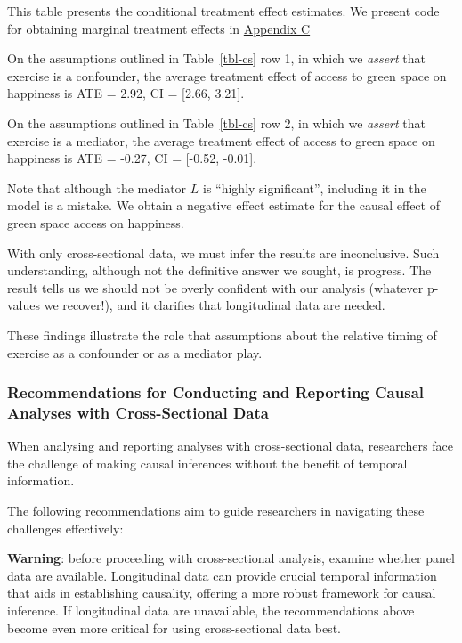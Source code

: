 \documentclass[
  singlecolumn]{article}
\begin{document}
This table presents the conditional treatment effect estimates. We
present code for obtaining marginal treatment effects in
\hyperref[appendix-c]{Appendix C}

On the assumptions outlined in Table~\ref{tbl-cs} row 1, in which we
\emph{assert} that exercise is a confounder, the average treatment
effect of access to green space on happiness is ATE = 2.92, CI =
{[}2.66, 3.21{]}.

On the assumptions outlined in Table~\ref{tbl-cs} row 2, in which we
\emph{assert} that exercise is a mediator, the average treatment effect
of access to green space on happiness is ATE = -0.27, CI = {[}-0.52,
-0.01{]}.

Note that although the mediator \(L\) is ``highly significant'',
including it in the model is a mistake. We obtain a negative effect
estimate for the causal effect of green space access on happiness.

With only cross-sectional data, we must infer the results are
inconclusive. Such understanding, although not the definitive answer we
sought, is progress. The result tells us we should not be overly
confident with our analysis (whatever p-values we recover!), and it
clarifies that longitudinal data are needed.

These findings illustrate the role that assumptions about the relative
timing of exercise as a confounder or as a mediator play.

\subsubsection{Recommendations for Conducting and Reporting Causal
Analyses with Cross-Sectional
Data}\label{recommendations-for-conducting-and-reporting-causal-analyses-with-cross-sectional-data}

When analysing and reporting analyses with cross-sectional data,
researchers face the challenge of making causal inferences without the
benefit of temporal information.

The following recommendations aim to guide researchers in navigating
these challenges effectively:

\textbf{Warning}: before proceeding with cross-sectional analysis,
examine whether panel data are available. Longitudinal data can provide
crucial temporal information that aids in establishing causality,
offering a more robust framework for causal inference. If longitudinal
data are unavailable, the recommendations above become even more
critical for using cross-sectional data best.
\end{document}
